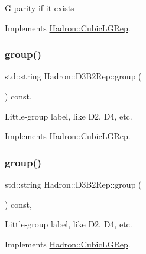 G-\/parity if it exists 

Implements \mbox{\hyperlink{structHadron_1_1CubicLGRep_ace26f7b2d55e3a668a14cb9026da5231}{Hadron\+::\+Cubic\+L\+G\+Rep}}.

\mbox{\label{structHadron_1_1D3B2Rep_a369bb27633b844c9d9a2023f27cfff74}} 
\subsubsection{\texorpdfstring{group()}{group()}\hspace{0.1cm}{\footnotesize\ttfamily [1/5]}}
{\footnotesize\ttfamily std\+::string Hadron\+::\+D3\+B2\+Rep\+::group (\begin{DoxyParamCaption}{ }\end{DoxyParamCaption}) const\hspace{0.3cm}{\ttfamily [inline]}, {\ttfamily [virtual]}}

Little-\/group label, like D2, D4, etc. 

Implements \mbox{\hyperlink{structHadron_1_1CubicLGRep_a9bdb14b519a611d21379ed96a3a9eb41}{Hadron\+::\+Cubic\+L\+G\+Rep}}.

\mbox{\label{structHadron_1_1D3B2Rep_a369bb27633b844c9d9a2023f27cfff74}} 
\subsubsection{\texorpdfstring{group()}{group()}\hspace{0.1cm}{\footnotesize\ttfamily [2/5]}}
{\footnotesize\ttfamily std\+::string Hadron\+::\+D3\+B2\+Rep\+::group (\begin{DoxyParamCaption}{ }\end{DoxyParamCaption}) const\hspace{0.3cm}{\ttfamily [inline]}, {\ttfamily [virtual]}}

Little-\/group label, like D2, D4, etc. 

Implements \mbox{\hyperlink{structHadron_1_1CubicLGRep_a9bdb14b519a611d21379ed96a3a9eb41}{Hadron\+::\+Cubic\+L\+G\+Rep}}.

\mbox{\label{structHadron_1_1D3B2Rep_a369bb27633b844c9d9a2023f27cfff74}} 
